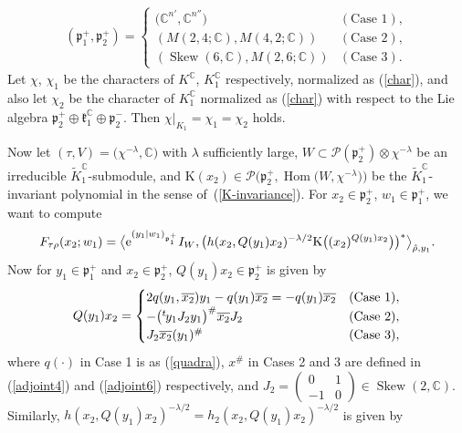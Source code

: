 \documentclass[pdftex]{sigma}
\numberwithin{equation}{section}
\newcommand{\BC}{\mathbb{C}}
\newcommand{\fk}{\mathfrak{k}}
\newcommand{\fp}{\mathfrak{p}}
\newcommand{\cP}{\mathcal{P}}
\newcommand{\rK}{\mathrm{K}}
\newcommand{\Hom}{\operatorname{Hom}}
\newcommand{\Skew}{\operatorname{Skew}}
\begin{document}
\begin{gather*} (\fp^+_1,\fp^+_2)=\begin{cases}
\big(\BC^{n'}, \BC^{n''}\big) & (\text{Case }1),\\
(M(2,4;\BC), M(4,2;\BC)) & (\text{Case }2),\\
(\Skew(6,\BC), M(2,6;\BC)) & (\text{Case }3). \end{cases} \end{gather*}
Let $\chi$, $\chi_1$ be the characters of $K^\BC$, $K_1^\BC$ respectively, normalized as (\ref{char}), and also let $\chi_2$ be the character of $K_1^\BC$ normalized as (\ref{char}) with respect to the Lie algebra $\fp^+_2\oplus\fk_1^\BC\oplus\fp^-_2$. Then $\chi|_{K_1}=\chi_1=\chi_2$ holds.

Now let $(\tau,V)=\big(\chi^{-\lambda},\BC\big)$ with $\lambda$ sufficiently large, $W\subset\cP(\fp^+_2)\otimes\chi^{-\lambda}$ be an irreducible $\tilde{K}^\BC_1$-submodule, and $\rK(x_2)\in \cP\big(\fp^+_2,\Hom\big(W,\chi^{-\lambda}\big)\big)$ be the $\tilde{K}^\BC_1$-invariant polynomial in the sense of~(\ref{K-invariance}). For $x_2\in\fp^+_2$, $w_1\in\fp^+_1$, we want to compute
\begin{align*}
F_{\tau\rho}(x_2;w_1)
=\big\langle {\rm e}^{(y_1|w_1)_{\fp^+_1}}I_W,
\big(h(x_2,Q(y_1)x_2)^{-\lambda/2}\rK\big((x_2)^{Q(y_1)x_2}\big)\big)^*\big\rangle_{\hat{\rho},y_1}.
\end{align*}
Now for $y_1\in\fp^+_1$ and $x_2\in\fp^+_2$, $Q(y_1)x_2\in\fp^+_2$ is given by
\begin{gather*} Q(y_1)x_2=\begin{cases} 2q(y_1,\overline{x_2})y_1-q(y_1)\overline{x_2}=-q(y_1)\overline{x_2} & (\text{Case }1),\\
-\big({}^t\hspace{-1pt}y_1J_2y_1\big)^\#\overline{x_2}J_2 & (\text{Case }2),\\
J_2\overline{x_2}(y_1)^\# & (\text{Case }3), \end{cases} \end{gather*}
where $q(\cdot)$ in Case 1 is as (\ref{quadra}), $x^\#$ in Cases 2 and 3 are defined in (\ref{adjoint4}) and (\ref{adjoint6}) respectively,
and $J_2=\left(\begin{smallmatrix}0&1\\-1&0\end{smallmatrix}\right)\in\Skew(2,\BC)$.
Similarly, $h(x_2,Q(y_1)x_2)^{-\lambda/2}=h_2(x_2,Q(y_1)x_2)^{-\lambda/2}$ is given by
\end{document}
